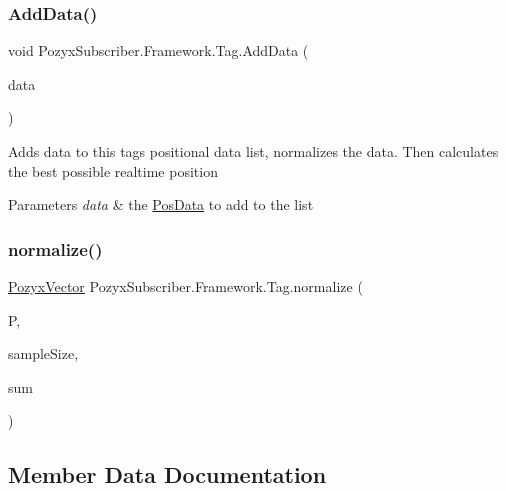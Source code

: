 \subsubsection{\texorpdfstring{Add\+Data()}{AddData()}}
{\footnotesize\ttfamily void Pozyx\+Subscriber.\+Framework.\+Tag.\+Add\+Data (\begin{DoxyParamCaption}\item[{\hyperlink{struct_pozyx_subscriber_1_1_framework_1_1_pos_data}{Pos\+Data}}]{data }\end{DoxyParamCaption})}



Adds data to this tag\textquotesingle{}s positional data list, normalizes the data. Then calculates the best possible realtime position 


\begin{DoxyParams}{Parameters}
{\em data} & the \hyperlink{struct_pozyx_subscriber_1_1_framework_1_1_pos_data}{Pos\+Data} to add to the list\\
\hline
\end{DoxyParams}
\mbox{\label{class_pozyx_subscriber_1_1_framework_1_1_tag_a937d43773dc3cbfa6a227fd933d015bd}} 
\subsubsection{\texorpdfstring{normalize()}{normalize()}}
{\footnotesize\ttfamily \hyperlink{struct_pozyx_subscriber_1_1_framework_1_1_pozyx_vector}{Pozyx\+Vector} Pozyx\+Subscriber.\+Framework.\+Tag.\+normalize (\begin{DoxyParamCaption}\item[{\hyperlink{struct_pozyx_subscriber_1_1_framework_1_1_pozyx_vector}{Pozyx\+Vector} \mbox{[}$\,$\mbox{]}}]{P,  }\item[{int}]{sample\+Size,  }\item[{\hyperlink{struct_pozyx_subscriber_1_1_framework_1_1_pozyx_vector}{Pozyx\+Vector}}]{sum }\end{DoxyParamCaption})\hspace{0.3cm}{\ttfamily [private]}}



\subsection{Member Data Documentation}
\mbox{\label{class_pozyx_subscriber_1_1_framework_1_1_tag_a3239688e001844a24284b8add4bda133}} 
